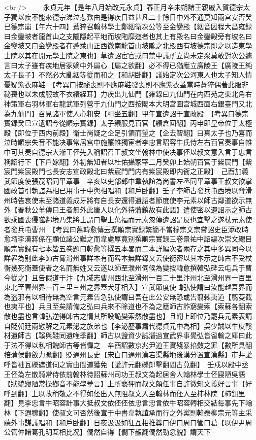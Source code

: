 <br />
　　永貞元年【是年八月始改元永貞】春正月辛未朔諸王親戚入賀德宗太子獨以疾不能來德宗涕泣悲歎由是得疾日益甚凡二十餘日中外不通莫知兩宫安否癸巳德宗崩【年六十四】蒼猝召翰林學士鄭絪衛次公等至金鑾殿【絪音因程大昌雍録曰金鑾坡者龍首山之支隴隱起平地而坡陁靡迤者也其上有殿名曰金鑾殿旁有坡名曰金鑾坡又曰金鑾殿者在蓬萊山正西微南龍首山坡隴之北殿西有坡德宗即之以造東學士院以其在開元學士院之東也】草遺詔宦官或曰禁中議所立尚未定衆莫敢對次公遽言曰太子雖有疾地居冢嫡中外屬心【屬之欲翻】必不得已猶應立廣陵王【廣陵王純太子長子】不然必大亂絪等從而和之【和胡卧翻】議始定次公河東人也太子知人情憂疑紫衣麻鞋　【考異曰按祕喪則不應麻鞋發喪則不應紫衣蓋當時蒼猝偶著此服非祕喪也以未成服故不衣縗絰耳】力疾出九仙門【雍錄曰九仙門在内西苑之東北角右神策軍右羽林軍右龍武軍列營于九仙門之西按閣本大明宫圖宫城西面右銀臺門又北為九仙門】召見諸軍使人心粗安【粗坐五翻】甲午宣遺詔于宣政殿　【考異曰德宗實録癸巳宣遺詔今從順宗實録】太子縗服見百官【縗倉回翻】丙申即皇帝位于太極殿【即位于西内前殿】衛士尚疑之企足引領而望之【企去智翻】曰真太子也乃喜而泣時順宗失音不能决事常居宫中施簾帷獨宦者李忠言昭容牛氏侍左右百官奏事自帷中可其奏自德宗大漸王伾先入稱詔召王叔文坐翰林中使决事伾以叔文意入言于忠言稱詔行下【下戶嫁翻】外初無知者以杜佑攝冢宰二月癸卯上始朝百官于紫宸門【紫宸門紫宸殿門也長安志宣政殿北曰紫宸門門内有紫宸殿即内衙之正殿】　己酉加義武節度使張茂昭同平章事　辛亥以吏部郎中韋執誼為尚書左丞同平章事王叔文欲掌國政首引執誼為相已用事于中與相唱和【和戶卧翻】壬子李師古發兵屯西境以脅滑州時告哀使未至諸道義成牙將有自長安還得遺詔者節度使李元素以師古鄰道欲示無外【春秋公羊傳曰王者無外此唐人以化外待藩鎮故有此語】遣使密以遺詔示之師古欲乘國喪侵噬鄰境乃集將士謂曰聖上萬福而元素忽傳遺詔是反也宜擊之遂杖元素使者發兵屯曹州　【考異曰舊韓愈傳云撰順宗實録繁簡不當穆宗文宗嘗詔史臣添改時愈壻李漢蔣係在顯位諸公難之而韋處厚竟别撰順宗實録三卷景祐中詔編次崇文總目順宗實録有七本皆五卷題曰韓愈等撰五本畧而二本詳編次者兩存之其中多異同今以詳畧為别此李師古脅滑州事詳本有而畧本無詳錄又云使衡密以其本示之師古不受杖衡幾死衡蓋使者之名而無姓又云遂以師至濮州伺候為變按韓愈撰韓弘碑云屯兵于曹今從之】且告假道于汴【九域志曹州西北至滑州一百二十里汴州北至滑州界一百里東北至曹州界一百三里三州之界蓋犬牙相入】宣武節度使韓弘使謂曰汝能越吾界而為盗邪有以相待無為空言元素告急弘使謂曰吾在此公安無恐或告翦棘夷道【翦芟截也夷平也】兵且至矣請備之弘曰兵來不除道也不為之應師古詐窮變索【索蘇各翻索散也盡也言韓弘逆得師古之情其所設詭變索然散盡也】且聞上即位乃罷兵元素表請自貶朝廷兩慰解之元素泌之族弟也【李泌歷事肅代德貞元中為相】吳少誠以牛皮鞵材遺師古【鞵與鞋同遺唯季翻】師古以鹽資少誠潛過宣武界事覺弘皆留輸之庫曰此于法不得以私相餽師古等皆憚之　辛酉詔數京兆尹道王實殘暴掊斂之罪【數所具翻掊蒲侯翻斂力贍翻】貶通州長史【宋白曰通州漢宕渠縣地後漢分置宣漢縣】市井讙呼皆䄂瓦礫遮道伺之實由間道獲免【讙許元翻礫郎擊翻間古莧翻】　壬戍以殿中丞王伾為左散騎常侍依前翰林待詔蘇州司功王叔文為起居舍人翰林學士伾寢陋吳語【狀貌寢陋常操鄉音不能學華言】上所䙝狎而叔文頗任事自許微知文義好言事【好呼到翻】上以故稍敬之不得如伾出入無阻叔文入至翰林而伾入至柿林院【柿鉏里翻】見李忠言牛昭容計事大抵叔文依伾伾依忠言忠言依牛昭容轉相交結每事先下翰林【下遐稼翻】使叔文可否然後宣于中書韋執誼承而行之外黨則韓泰柳宗元等主采聼外事謀議唱和【和戶卧翻】日夜汲汲如狂互相推奬曰伊曰周曰管曰葛【以伊尹周公管仲諸葛孔明互相比况】僴然自得【僴下赧翻僴然勁忿貌】謂天下